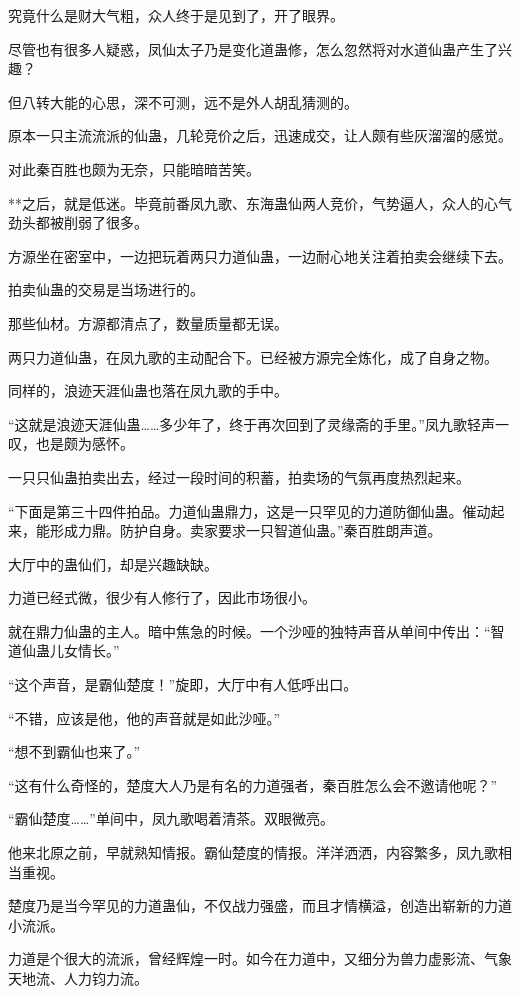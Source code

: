 \begin{this_body}
究竟什么是财大气粗，众人终于是见到了，开了眼界。

尽管也有很多人疑惑，凤仙太子乃是变化道蛊修，怎么忽然将对水道仙蛊产生了兴趣？

但八转大能的心思，深不可测，远不是外人胡乱猜测的。

原本一只主流流派的仙蛊，几轮竞价之后，迅速成交，让人颇有些灰溜溜的感觉。

对此秦百胜也颇为无奈，只能暗暗苦笑。

**之后，就是低迷。毕竟前番凤九歌、东海蛊仙两人竞价，气势逼人，众人的心气劲头都被削弱了很多。

方源坐在密室中，一边把玩着两只力道仙蛊，一边耐心地关注着拍卖会继续下去。

拍卖仙蛊的交易是当场进行的。

那些仙材。方源都清点了，数量质量都无误。

两只力道仙蛊，在凤九歌的主动配合下。已经被方源完全炼化，成了自身之物。

同样的，浪迹天涯仙蛊也落在凤九歌的手中。

“这就是浪迹天涯仙蛊……多少年了，终于再次回到了灵缘斋的手里。”凤九歌轻声一叹，也是颇为感怀。

一只只仙蛊拍卖出去，经过一段时间的积蓄，拍卖场的气氛再度热烈起来。

“下面是第三十四件拍品。力道仙蛊鼎力，这是一只罕见的力道防御仙蛊。催动起来，能形成力鼎。防护自身。卖家要求一只智道仙蛊。”秦百胜朗声道。

大厅中的蛊仙们，却是兴趣缺缺。

力道已经式微，很少有人修行了，因此市场很小。

就在鼎力仙蛊的主人。暗中焦急的时候。一个沙哑的独特声音从单间中传出：“智道仙蛊儿女情长。”

“这个声音，是霸仙楚度！”旋即，大厅中有人低呼出口。

“不错，应该是他，他的声音就是如此沙哑。”

“想不到霸仙也来了。”

“这有什么奇怪的，楚度大人乃是有名的力道强者，秦百胜怎么会不邀请他呢？”

“霸仙楚度……”单间中，凤九歌喝着清茶。双眼微亮。

他来北原之前，早就熟知情报。霸仙楚度的情报。洋洋洒洒，内容繁多，凤九歌相当重视。

楚度乃是当今罕见的力道蛊仙，不仅战力强盛，而且才情横溢，创造出崭新的力道小流派。

力道是个很大的流派，曾经辉煌一时。如今在力道中，又细分为兽力虚影流、气象天地流、人力钧力流。


\end{this_body}
